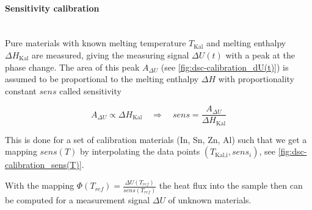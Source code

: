 \documentclass{scrartcl}[12pt, halfparskip]
\numberwithin{equation}{section}
\numberwithin{figure}{section}
\numberwithin{table}{section}
\begin{document}
\paragraph{Sensitivity calibration}\mbox{}\\
Pure materials with known melting temperature $T_{\text{Kal}}$ and melting enthalpy $\Delta H_{\text{Kal}}$ are measured, giving the measuring signal $\Delta U(t)$ with a peak at the phase change. 
The area of this peak $A_{\Delta U}$ (see \cref{fig:dsc-calibration_dU(t)}) is assumed to be proportional to the melting enthalpy $\Delta H$ with proportionality constant $sens$ called sensitivity

\begin{equation}
	A_{\Delta U} \propto \Delta H_{\text{Kal}} \quad \Rightarrow \quad sens = \frac{A_{\Delta U}}{\Delta H_{\text{Kal}}}
\end{equation} 

This is done for a set of calibration materials (In, Sn, Zn, Al) such that we get a mapping $sens(T)$ by interpolating the data points $(T_{\text{Kal,i}}, sens_i)$, see \cref{fig:dsc-calibration_sens(T)}.

With the mapping $\varPhi(T_{ref}) = \frac{\Delta U(T_{ref})}{sens(T_{ref})}$ the heat flux into the sample then can be computed for a measurement signal $\Delta U$ of unknown materials. 
\end{document}
